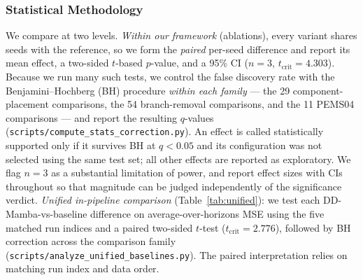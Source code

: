 \documentclass[review,12pt]{elsarticle}
\newcommand{\model}{DD-Mamba}
\begin{document}
\subsubsection{Statistical Methodology}
We compare at two levels.
\emph{Within our framework} (ablations), every variant shares seeds with
the reference, so we form the \emph{paired} per-seed difference and report
its mean effect, a two-sided $t$-based $p$-value, and a 95\% CI ($n{=}3$,
$t_{\text{crit}}{=}4.303$). Because we run many such tests, we control the
false discovery rate with the Benjamini--Hochberg (BH) procedure
\emph{within each family} --- the 29 component-placement comparisons, the 54
branch-removal comparisons, and the 11 PEMS04 comparisons --- and report the
resulting $q$-values (\texttt{scripts/compute\_stats\_correction.py}).
An effect is called statistically supported only if it survives BH at
$q{<}0.05$ and its configuration was not selected using the same test set;
all other effects are reported as exploratory. We flag $n{=}3$ as a
substantial limitation of power, and report effect sizes with CIs throughout
so that magnitude can be judged independently of the significance verdict.
\emph{Unified in-pipeline comparison} (Table~\ref{tab:unified}): we test
each \model{}-vs-baseline difference on average-over-horizons MSE using the
five matched run indices and a paired two-sided $t$-test
($t_{\text{crit}}{=}2.776$), followed by BH correction across the comparison
family (\texttt{scripts/analyze\_unified\_baselines.py}). The paired
interpretation relies on matching run index and data order.
\end{document}
